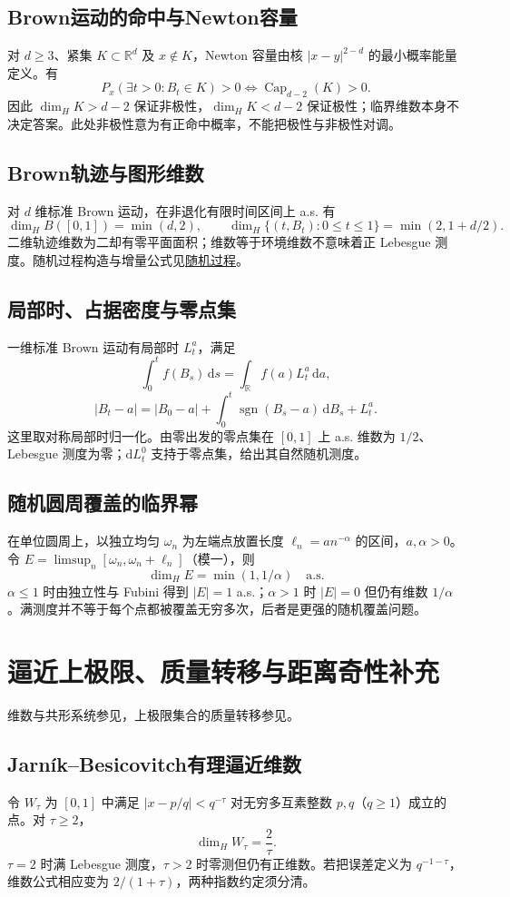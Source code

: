\documentclass[../main.tex]{subfiles}
\begin{document}
\subsection{Brown运动的命中与Newton容量}
对 $d\ge3$、紧集 $K\subset\mathbb R^d$ 及 $x\notin K$，Newton 容量由核 $|x-y|^{2-d}$ 的最小概率能量定义。有
\[
P_x(\exists t>0:B_t\in K)>0\iff\operatorname{Cap}_{d-2}(K)>0.
\]
因此 $\dim_HK>d-2$ 保证非极性，$\dim_HK<d-2$ 保证极性；临界维数本身不决定答案。此处非极性意为有正命中概率，不能把极性与非极性对调。
\subsection{Brown轨迹与图形维数}
对 $d$ 维标准 Brown 运动，在非退化有限时间区间上 a.s. 有
\[
\dim_H B([0,1])=\min(d,2),\qquad
\dim_H\{(t,B_t):0\le t\le1\}=\min(2,1+d/2).
\]
二维轨迹维数为二却有零平面面积；维数等于环境维数不意味着正 Lebesgue 测度。随机过程构造与增量公式见\hyperref[chap:stochastic-processes]{随机过程}。
\subsection{局部时、占据密度与零点集}
一维标准 Brown 运动有局部时 $L_t^a$，满足
\[
\int_0^tf(B_s)\,\mathrm ds=\int_{\mathbb R}f(a)L_t^a\,\mathrm da,
\]
\[
|B_t-a|=|B_0-a|+\int_0^t\operatorname{sgn}(B_s-a)\,\mathrm dB_s+L_t^a.
\]
这里取对称局部时归一化。由零出发的零点集在 $[0,1]$ 上 a.s. 维数为 $1/2$、Lebesgue 测度为零；$\mathrm dL_t^0$ 支持于零点集，给出其自然随机测度。
\subsection{随机圆周覆盖的临界幂}
在单位圆周上，以独立均匀 $\omega_n$ 为左端点放置长度 $\ell_n=a n^{-\alpha}$ 的区间，$a,\alpha>0$。令 $E=\limsup_n[\omega_n,\omega_n+\ell_n]$（模一），则
\[
\dim_HE=\min(1,1/\alpha)\quad\text{a.s.}
\]
$\alpha\le1$ 时由独立性与 Fubini 得到 $|E|=1$ a.s.；$\alpha>1$ 时 $|E|=0$ 但仍有维数 $1/\alpha$。满测度并不等于每个点都被覆盖无穷多次，后者是更强的随机覆盖问题。

\section{逼近上极限、质量转移与距离奇性补充}
维数与共形系统参见\cite{falconer}，上极限集合的质量转移参见\cite{mtp}。
\subsection{Jarník--Besicovitch有理逼近维数}
令 $W_\tau$ 为 $[0,1]$ 中满足 $|x-p/q|<q^{-\tau}$ 对无穷多互素整数 $p,q$（$q\ge1$）成立的点。对 $\tau\ge2$，
\[
\dim_HW_\tau=\frac2\tau.
\]
$\tau=2$ 时满 Lebesgue 测度，$\tau>2$ 时零测但仍有正维数。若把误差定义为 $q^{-1-\tau}$，维数公式相应变为 $2/(1+\tau)$，两种指数约定须分清。
\end{document}
